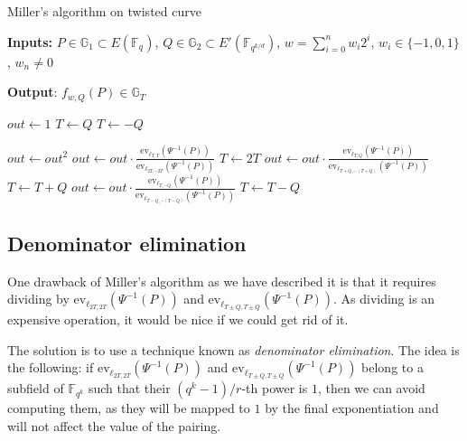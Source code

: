 \documentclass{article}
\newcommand{\gOne}{\mathbb{G}_1}
\newcommand{\gTwo}{\mathbb{G}_2}
\newcommand{\gT}{\mathbb{G}_T}
\newcommand{\ev}{\mathrm{ev}}
\newcommand{\fq}[1]{\mathbb{F}_{q^{#1}}}
\theoremstyle{remark}
\theoremstyle{plain}
\begin{document}
\begin{algorithm}
    \label{alg:millerOnTwistedCurve}
    \caption{\small Miller's algorithm on twisted curve}\label{alg:millerAlgorithWithTwistedCurve}
    \textbf{Inputs:} $P \in \gOne \subset E(\fq{})$, $Q \in \gTwo \subset E'(\fq{k/d})$, $w = \sum_{i=0}^n w_i 2^i$, $w_i \in \{-1,0,1\}$, $w_n \neq 0$

    \textbf{Output}: $f_{w,Q}(P) \in \gT$
    \begin{algorithmic}
        \State $out \gets 1$
            \State $T \gets Q$
        \Else
            \State $T \gets -Q$
        \EndIf

        \State $out \gets out^2$
        \State $out \gets out \cdot \frac{\ev_{\ell_{T,T}}(\Psi^{-1}(P))}{\ev_{\ell_{2T,-2T}}(\Psi^{-1}(P))}$
        \State $T \gets 2T$
            \State $out \gets out \cdot \frac{\ev_{\ell_{T,Q}}(\Psi^{-1}(P))}{\ev_{\ell_{T+Q,-(T+Q)}}(\Psi^{-1}(P))}$
            \State $T \gets T + Q$
        \Else
            \State $out \gets out \cdot \frac{\ev_{\ell_{T,-Q}}(\Psi^{-1}(P))}{\ev_{\ell_{T-Q,-(T-Q)}}(\Psi^{-1}(P))}$
            \State $T \gets T - Q$
        \EndIf
        \EndFor
    \end{algorithmic}
\end{algorithm}

\subsection{Denominator elimination}

One drawback of Miller's algorithm as we have described it is that it requires dividing by $\ev_{\ell_{2T, 2T}}(\Psi^{-1}(P))$ and $\ev_{\ell_{T \pm Q, T \pm Q}}(\Psi^{-1}(P))$.
As dividing is an expensive operation, it would be nice if we could get rid of it.

The solution is to use a technique known as \emph{denominator elimination}.
The idea is the following: if $\ev_{\ell_{2T, 2T}}(\Psi^{-1}(P))$ and $\ev_{\ell_{T \pm Q, T \pm Q}}(\Psi^{-1}(P))$ belong to a subfield of $\fq{k}$ such that their $(q^k - 1)/r$-th power is $1$, then we can avoid computing them, as they will be mapped to $1$ by the final exponentiation and will not affect the value of the pairing.
\end{document}
